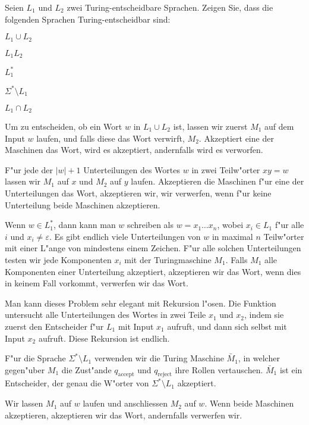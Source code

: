 Seien $L_1$ und $L_2$ zwei Turing-entscheidbare Sprachen. Zeigen Sie, dass
die folgenden Sprachen Turing-entscheidbar sind:
\begin{teilaufgaben}
\item $L_1\cup L_2$
\item $L_1L_2$
\item $L_1^*$
\item $\Sigma^*\setminus L_1$
\item $L_1\cap L_2$
\end{teilaufgaben}

\begin{loesung}
\begin{teilaufgaben}
\item Um zu entscheiden, ob ein Wort $w$ in $L_1\cup L_2$ ist,
lassen wir zuerst $M_1$ auf dem Input $w$ laufen, und falls
diese das Wort verwirft, $M_2$. Akzeptiert eine der Maschinen
das Wort, wird es akzeptiert, andernfalls wird es verworfen.
\item
F"ur jede der $|w|+1$ Unterteilungen des Wortes $w$ in zwei
Teilw"orter $xy=w$ lassen wir $M_1$ auf $x$ und $M_2$ auf
$y$ laufen. Akzeptieren die Maschinen f"ur eine der
Unterteilungen das Wort, akzeptieren wir, wir verwerfen, wenn
f"ur keine Unterteilung beide Maschinen akzeptieren.
\item
Wenn $w\in L_1^*$, dann kann man $w$ schreiben als
$w=x_1\dots x_n$, wobei $x_i\in L_1$ f"ur alle $i$ und
$x_i\ne \varepsilon$. Es gibt endlich viele Unterteilungen
von $w$ in maximal $n$ Teilw"orter mit einer L"ange von
mindestens einem Zeichen. F"ur alle solchen Unterteilungen
testen wir jede Komponenten $x_i$ mit der Turingmaschine
$M_1$. Falls $M_1$ alle Komponenten einer Unterteilung
akzeptiert, akzeptieren wir das Wort, wenn dies in keinem Fall
vorkommt, verwerfen wir das Wort.

Man kann dieses Problem sehr elegant mit Rekursion l"osen.
Die Funktion untersucht alle Unterteilungen des Wortes in
zwei Teile $x_1$ und $x_2$, indem sie zuerst den Entscheider
f"ur $L_1$ mit Input $x_1$ aufruft, und dann sich selbst
mit Input $x_2$ aufruft. Diese Rekursion ist endlich.
\item
F"ur die Sprache $\Sigma^*\setminus L_1$ verwenden wir die
Turing Maschine $\bar M_1$, in welcher gegen"uber $M_1$
die Zust"ande $q_{\text{accept}}$ und $q_{\text{reject}}$
ihre Rollen vertauschen. $\bar M_1$ ist ein Entscheider,
der genau die W"orter von $\Sigma^*\setminus L_1$ akzeptiert.
\item
Wir lassen $M_1$ auf $w$ laufen und anschliessen $M_2$ auf $w$.
Wenn beide Maschinen akzeptieren, akzeptieren wir das Wort, andernfalls
verwerfen wir.
\end{teilaufgaben}
\end{loesung}
